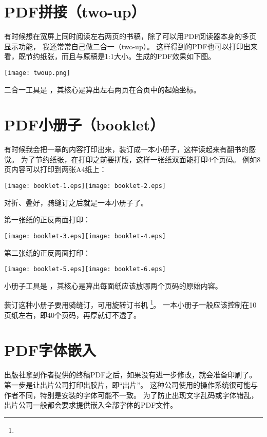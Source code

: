 

\section{PDF拼接（two-up）}
有时候想在宽屏上同时阅读左右两页的书稿，除了可以用PDF阅读器本身的多页显示功能，
我还常常自己做二合一（two-up）。
这样得到的PDF也可以打印出来看，既节约纸张，而且与原稿是1:1大小。生成的PDF效果如下图。

\vspace{1ex}
\centerline{\texttt{[image: twoup.png]}}

二合一工具是 ，其核心是算出左右两页在合页中的起始坐标。

\section{PDF小册子（booklet）}

有时候我会把一章的内容打印出来，装订成一本小册子，这样读起来有翻书的感觉。
为了节约纸张，在打印之前要拼版，这样一张纸双面能打印4个页码。
例如8页内容可以打印到两张A4纸上：

\vspace{1ex}
\centerline{\texttt{[image: booklet-1.eps]}\qquad\texttt{[image: booklet-2.eps]}}

对折、叠好，骑缝订之后就是一本小册子了。

\begin{center}

第一张纸的正反两面打印：

\vspace{1ex}
\texttt{[image: booklet-3.eps]}\qquad\texttt{[image: booklet-4.eps]}

\vspace{1em}
第二张纸的正反两面打印：

\vspace{1ex}
\texttt{[image: booklet-5.eps]}\qquad\texttt{[image: booklet-6.eps]}
\end{center}

小册子工具是 ，其核心是算出每面纸应该放哪两个页码的原始内容。

装订这种小册子要用骑缝订，可用旋转订书机
\footnote{ \quad {}}。
一本小册子一般应该控制在10页纸左右，即40个页码，再厚就订不透了。

\section{PDF字体嵌入}
出版社拿到作者提供的终稿PDF之后，如果没有进一步修改，就会准备印刷了。
第一步是让出片公司打印出胶片，即“出片”。
这种公司使用的操作系统很可能与作者不同，特别是安装的字体可能不一致。
为了防止出现文字乱码或字体错乱，出片公司一般都会要求提供嵌入全部字体的PDF文件。
